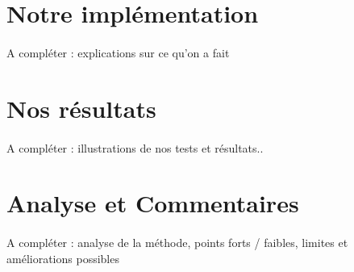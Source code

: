 \documentclass[a4paper,10pt]{report}
\begin{document}
\section{Notre implémentation}
\paragraph{}
A compléter : explications sur ce qu'on a fait

\section{Nos résultats}
\paragraph{}
A compléter : illustrations de nos tests et résultats..

\section{Analyse et Commentaires}
\paragraph{}
A compléter : analyse de la méthode, points forts / faibles, limites et améliorations possibles




\begin{abstract}
\end{abstract}
\end{document}
